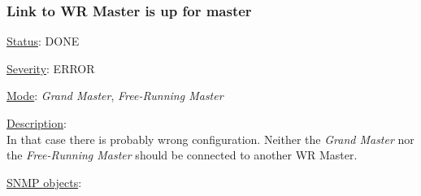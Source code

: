 \subsubsection{\bf Link to WR Master is up for master}
		\label{fail:timing:master_up}
		\begin{packed_enum}
			\item [] \underline{Status}: DONE
			\item [] \underline{Severity}: ERROR
			\item [] \underline{Mode}: \emph{Grand Master}, \emph{Free-Running Master}
			\item [] \underline{Description}:\\
				In that case there is probably wrong configuration. Neither the
				\emph{Grand Master} nor the \emph{Free-Running Master} should be
				connected to another WR Master.
			\item [] \underline{SNMP objects}:\\
				\\
				\\
		\end{packed_enum}

